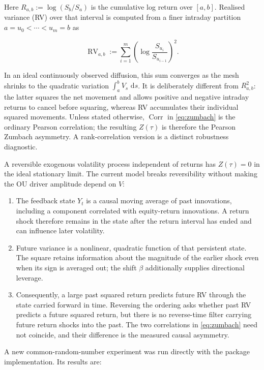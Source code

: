\documentclass[11pt,a4paper]{article}
\newcommand{\dd}{\,\mathrm{d}}
\newcommand{\Corr}{\operatorname{Corr}}
\begin{document}
Here \(R_{a,b}:=\log(S_b/S_a)\) is the cumulative log return over \([a,b]\).  Realised
variance (RV) over that interval is computed from a finer intraday partition
\(a=u_0<\cdots<u_m=b\) as

\begin{equation*}
\operatorname{RV}_{a,b}:=\sum_{i=1}^{m}
\left(\log\frac{S_{u_i}}{S_{u_{i-1}}}\right)^2.
\end{equation*}

In an ideal continuously observed diffusion, this sum converges as the mesh shrinks to the
quadratic variation \(\int_a^b V_s\,\dd s\).  It is deliberately different from
\(R_{a,b}^2\): the latter squares the net movement and allows positive and negative intraday
returns to cancel before squaring, whereas RV accumulates their individual squared movements.
Unless stated otherwise, \(\Corr\) in \cref{eq:zumbach} is the ordinary Pearson correlation;
the resulting \(Z(\tau)\) is therefore the Pearson Zumbach asymmetry.  A rank-correlation
version is a distinct robustness diagnostic.

A reversible exogenous volatility process independent of returns has \(Z(\tau)=0\) in the
ideal stationary limit. The current model breaks reversibility without making the OU driver
amplitude depend on \(V\):

\begin{enumerate}
  \item The feedback state \(Y_t\) is a causal moving average of past innovations, including a
  component correlated with equity-return innovations.  A return shock therefore remains in
  the state after the return interval has ended and can influence later volatility.
  \item Future variance is a nonlinear, quadratic function of that persistent state.  The
  square retains information about the magnitude of the earlier shock even when its sign is
  averaged out; the shift \(\beta\) additionally supplies directional leverage.
  \item Consequently, a large past squared return predicts future RV through the state carried
  forward in time.  Reversing the ordering asks whether past RV predicts a future squared
  return, but there is no reverse-time filter carrying future return shocks into the past.
  The two correlations in \cref{eq:zumbach} need not coincide, and their difference is the
  measured causal asymmetry.
\end{enumerate}

A new common-random-number experiment was run directly with the package implementation.  Its
results are:
\end{document}
